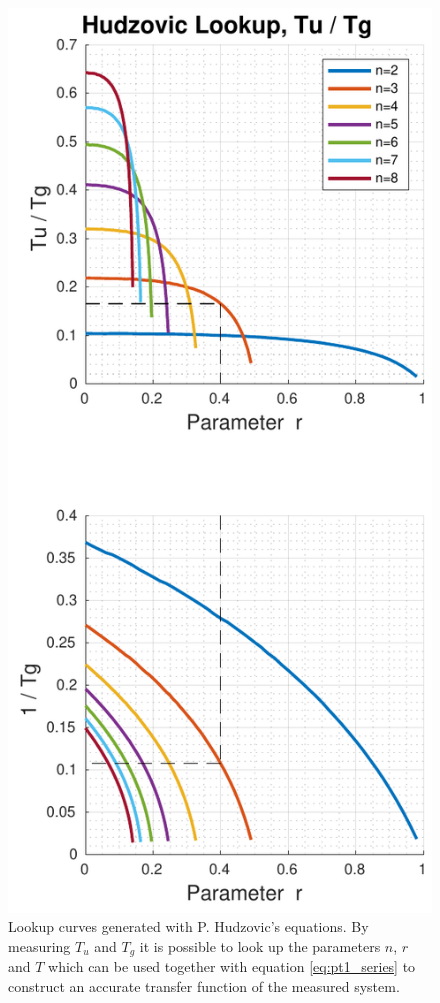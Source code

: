 \begin{figure}[t]
    \centering
    \includegraphics[width=\imagewidth]{images/hudzovic_curves_tu_tg.pdf}
    \caption{Lookup curves generated with P. Hudzovic's equations. By measuring $T_u$ and $T_g$ it is possible to look up the parameters $n$, $r$ and $T$ which can be used together with equation \ref{eq:pt1_series} to construct an accurate transfer function of the measured system.}
    \label{fig:hudzovic}
\end{figure}

